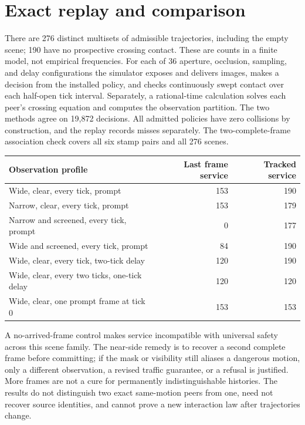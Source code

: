 \documentclass[11pt]{article}
\begin{document}
\section{Exact replay and comparison}

There are 276 distinct multisets of admissible trajectories, including the empty scene; 190 have no prospective crossing contact. These are counts in a finite model, not empirical frequencies. For each of 36 aperture, occlusion, sampling, and delay configurations the simulator exposes and delivers images, makes a decision from the installed policy, and checks continuously swept contact over each half-open tick interval. Separately, a rational-time calculation solves each peer's crossing equation and computes the observation partition. The two methods agree on 19,872 decisions. All admitted policies have zero collisions by construction, and the replay records misses separately. The two-complete-frame association check covers all six stamp pairs and all 276 scenes.

\begin{center}
\begin{tabular}{lrr}
Observation profile & Last frame service & Tracked service\\\hline
Wide, clear, every tick, prompt & 153 & 190\\
Narrow, clear, every tick, prompt & 153 & 179\\
Narrow and screened, every tick, prompt & 0 & 177\\
Wide and screened, every tick, prompt & 84 & 190\\
Wide, clear, every tick, two-tick delay & 120 & 190\\
Wide, clear, every two ticks, one-tick delay & 120 & 120\\
Wide, clear, one prompt frame at tick 0 & 153 & 153
\end{tabular}
\end{center}

A no-arrived-frame control makes service incompatible with universal safety across this scene family. The near-side remedy is to recover a second complete frame before committing; if the mask or visibility still aliases a dangerous motion, only a different observation, a revised traffic guarantee, or a refusal is justified. More frames are not a cure for permanently indistinguishable histories. The results do not distinguish two exact same-motion peers from one, need not recover source identities, and cannot prove a new interaction law after trajectories change.
\end{document}
